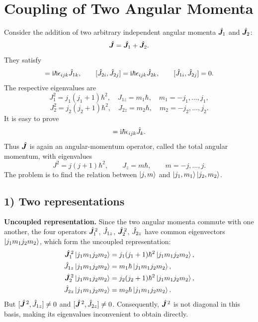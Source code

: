 \section{Coupling of Two Angular Momenta}
Consider the addition of two arbitrary independent angular momenta $\hat{\bm{J}}_1$ and $\hat{\bm{J}}_2$:
\begin{equation}
\hat{\bm{J}}=\hat{\bm{J}}_1+\hat{\bm{J}}_2.
\end{equation}
They satisfy
\begin{equation}
[\op J_{1i},\op J_{1j}]=\ii\hbar\epsilon_{ijk}\op J_{1k},\qquad
[\op J_{2i},\op J_{2j}]=\ii\hbar\epsilon_{ijk}\op J_{2k},\qquad
[\op J_{1i},\op J_{2j}]=0.
\end{equation}
The respective eigenvalues are
\begin{equation}
J_1^2=j_1(j_1+1)\hbar^2,\quad J_{1z}=m_1\hbar,\quad m_1=-j_1,\ldots,j_1,
\end{equation}
\begin{equation}
J_2^2=j_2(j_2+1)\hbar^2,\quad J_{2z}=m_2\hbar,\quad m_2=-j_2,\ldots,j_2.
\end{equation}
It is easy to prove
\begin{equation}
[\op J_i,\op J_j]=\ii\hbar\epsilon_{ijk}\op J_k.
\end{equation}
Thus $\hat{\bm{J}}$ is again an angular-momentum operator, called the total angular momentum, with eigenvalues
\begin{equation}
J^2=j(j+1)\hbar^2,\qquad J_z=m\hbar,\qquad m=-j,\ldots,j.
\end{equation}
The problem is to find the relation between $\left|j,m\right\rangle$ and $\left|j_1,m_1\right\rangle\left|j_2,m_2\right\rangle$.

\subsection*{1) Two representations}
\textbf{Uncoupled representation.} Since the two angular momenta commute with one another, the four operators $\hat{\bm{J}}_1^{\,2}$, $\hat{J}_{1z}$, $\hat{\bm{J}}_2^{\,2}$, $\hat{J}_{2z}$ have common eigenvectors $\left|j_1m_1j_2m_2\right\rangle$, which form the uncoupled representation:
\begin{equation}
\begin{aligned}
\hat{\bm{J}}_1^{\,2}\left|j_1m_1j_2m_2\right\rangle&=j_1(j_1+1)\hbar^2\left|j_1m_1j_2m_2\right\rangle,\\
\hat{J}_{1z}\left|j_1m_1j_2m_2\right\rangle&=m_1\hbar\left|j_1m_1j_2m_2\right\rangle,\\
\hat{\bm{J}}_2^{\,2}\left|j_1m_1j_2m_2\right\rangle&=j_2(j_2+1)\hbar^2\left|j_1m_1j_2m_2\right\rangle,\\
\hat{J}_{2z}\left|j_1m_1j_2m_2\right\rangle&=m_2\hbar\left|j_1m_1j_2m_2\right\rangle.
\end{aligned}
\end{equation}
But $[\hat{\bm{J}}^{\,2},\hat{J}_{1z}]\ne0$ and $[\hat{\bm{J}}^{\,2},\hat{J}_{2z}]\ne0$. Consequently, $\hat{\bm{J}}^{\,2}$ is not diagonal in this basis, making its eigenvalues inconvenient to obtain directly.

